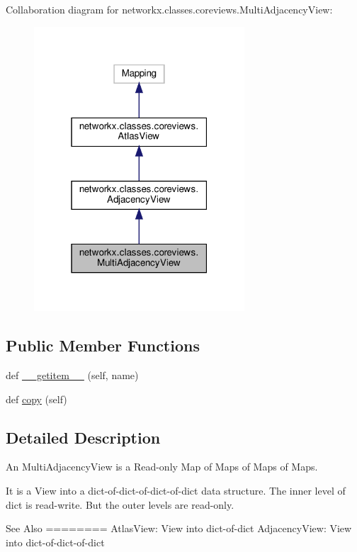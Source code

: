 Collaboration diagram for networkx.\+classes.\+coreviews.\+Multi\+Adjacency\+View\+:
\nopagebreak
\begin{figure}[H]
\begin{center}
\leavevmode
\includegraphics[width=223pt]{classnetworkx_1_1classes_1_1coreviews_1_1MultiAdjacencyView__coll__graph}
\end{center}
\end{figure}
\subsection*{Public Member Functions}
\begin{DoxyCompactItemize}
\item 
def \hyperlink{classnetworkx_1_1classes_1_1coreviews_1_1MultiAdjacencyView_a48653c1b3f2a2f1fd75526c766105c15}{\+\_\+\+\_\+getitem\+\_\+\+\_\+} (self, name)
\item 
def \hyperlink{classnetworkx_1_1classes_1_1coreviews_1_1MultiAdjacencyView_a2b211b41d9cd2d7380f02a598c8a3018}{copy} (self)
\end{DoxyCompactItemize}


\subsection{Detailed Description}
\begin{DoxyVerb}An MultiAdjacencyView is a Read-only Map of Maps of Maps of Maps.

It is a View into a dict-of-dict-of-dict-of-dict data structure.
The inner level of dict is read-write. But the
outer levels are read-only.

See Also
========
AtlasView: View into dict-of-dict
AdjacencyView: View into dict-of-dict-of-dict
\end{DoxyVerb}
 

